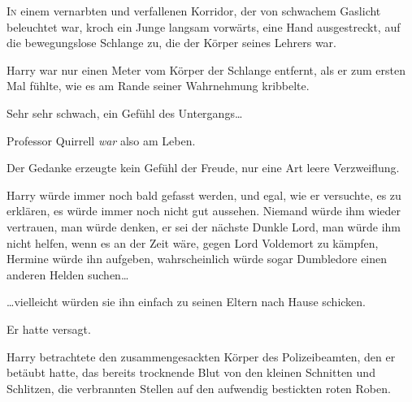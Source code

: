 
\lettrine{I}{n} einem vernarbten und verfallenen Korridor, der von schwachem Gaslicht beleuchtet war, kroch ein Junge langsam vorwärts, eine Hand ausgestreckt, auf die bewegungslose Schlange zu, die der Körper seines Lehrers war.

Harry war nur einen Meter vom Körper der Schlange entfernt, als er zum ersten Mal fühlte, wie es am Rande seiner Wahrnehmung kribbelte.

Sehr sehr schwach, ein Gefühl des Untergangs…

Professor Quirrell \emph{war} also am Leben.

Der Gedanke erzeugte kein Gefühl der Freude, nur eine Art leere Verzweiflung.

Harry würde immer noch bald gefasst werden, und egal, wie er versuchte, es zu erklären, es würde immer noch nicht gut aussehen. Niemand würde ihm wieder vertrauen, man würde denken, er sei der nächste Dunkle Lord, man würde ihm nicht helfen, wenn es an der Zeit wäre, gegen Lord Voldemort zu kämpfen, Hermine würde ihn aufgeben, wahrscheinlich würde sogar Dumbledore einen anderen Helden suchen…

…vielleicht würden sie ihn einfach zu seinen Eltern nach Hause schicken.

Er hatte versagt.

Harry betrachtete den zusammengesackten Körper des Polizeibeamten, den er betäubt hatte, das bereits trocknende Blut von den kleinen Schnitten und Schlitzen, die verbrannten Stellen auf den aufwendig bestickten roten Roben.

